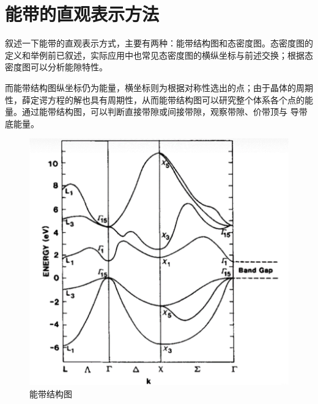 \section{能带的直观表示方法}

叙述一下能带的直观表示方式，主要有两种：能带结构图和态密度图。态密度图的定义和举例前已叙述，实际应用中也常见态密度图的横纵坐标与前述交换；根据态密度图可以分析能隙特性。

而能带结构图纵坐标仍为能量，横坐标则为根据对称性选出的点；由于晶体的周期性，薛定谔方程的解也具有周期性，从而能带结构图可以研究整个体系各个点的能量。通过能带结构图，可以判断直接带隙或间接带隙，观察带隙、价带顶与
导带底能量。

\begin{figure}
    \centering
    \includegraphics[scale=0.8]{img/能带结构图.png}
    \caption{能带结构图}
\end{figure}